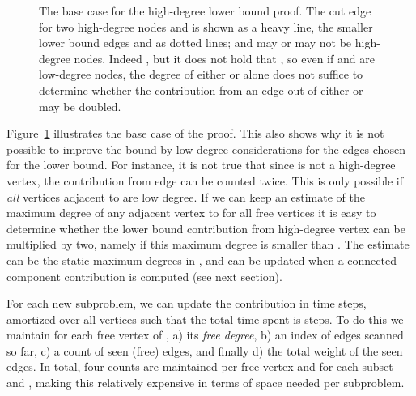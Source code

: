 \documentclass[a4paper,11pt]{article}
\begin{document}
\begin{figure}
\centering
{}
\caption{The base case for the high-degree lower bound proof. The cut
  edge  for two high-degree nodes  and  is shown as a
  heavy line, the smaller lower bound edges  and  as
  dotted lines;  and  may or may not be high-degree
  nodes. Indeed , but it does
  not hold that , so even if
   and  are low-degree nodes, the degree of either  or
   alone does not suffice to determine whether the contribution
  from an edge out of either  or  may be doubled.}
\label{fig:highdegreecounterex}
\end{figure}

Figure~\ref{fig:highdegreecounterex} illustrates the base case of the
proof. This also shows why it is not possible to improve the bound by
low-degree considerations for the edges chosen for the lower
bound. For instance, it is not true that since  is not a
high-degree vertex, the contribution from edge  can be counted
twice. This is only possible if \emph{all} vertices adjacent to 
are low degree. If we can keep an estimate of the maximum degree of
any adjacent vertex to  for all free vertices  it is easy
to determine whether the lower bound contribution from high-degree
vertex  can be multiplied by two, namely if this maximum degree is
smaller than . The estimate can be the static maximum degrees in
, and can be updated when a connected component contribution is
computed (see next section).

For each new subproblem, we can update the  contribution in
 time steps, amortized over all vertices such that the
total time spent is  steps. To do this we maintain for each
free vertex of , a) its \emph{free degree}, b) an index of
edges scanned so far, c) a count of seen (free) edges, and finally d)
the total weight of the seen edges. In total, four counts are
maintained per free vertex and for each subset  and
, making this relatively expensive in terms of space
needed per subproblem.
\end{document}
